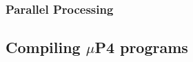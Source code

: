 \subsubsection{Parallel Processing}


\subsection{Compiling $\mu$P4 programs}











% 
% 
% 
% 
% 




